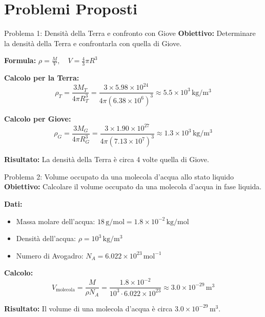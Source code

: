 \documentclass[9pt]{beamer}
\begin{document}
\section{Problemi Proposti}

\begin{frame}{Problema 1: Densità della Terra e confronto con Giove}
    \textbf{Obiettivo:} Determinare la densità della Terra e confrontarla con quella di Giove.
    
    \textbf{Formula:} $\rho = \frac{M}{V}, \quad V = \frac{4}{3} \pi R^3$
    
    \textbf{Calcolo per la Terra:}
    \[
    \rho_T = \frac{3 M_T}{4 \pi R_T^3} = \frac{3 \times 5.98 \times 10^{24}}{4 \pi (6.38 \times 10^6)^3} \approx 5.5 \times 10^3 \, \mathrm{kg/m^3}
    \]
    
    \textbf{Calcolo per Giove:}
    \[
    \rho_G = \frac{3 M_G}{4 \pi R_G^3} = \frac{3 \times 1.90 \times 10^{27}}{4 \pi (7.13 \times 10^7)^3} \approx 1.3 \times 10^3 \, \mathrm{kg/m^3}
    \]
    
    \textbf{Risultato:} La densità della Terra è circa 4 volte quella di Giove.
\end{frame}

\begin{frame}{Problema 2: Volume occupato da una molecola d'acqua allo stato liquido}
    \textbf{Obiettivo:} Calcolare il volume occupato da una molecola d'acqua in fase liquida.
    
    \textbf{Dati:}
    \begin{itemize}
        \item Massa molare dell'acqua: $18 \, \mathrm{g/mol} = 1.8 \times 10^{-2} \, \mathrm{kg/mol}$
        \item Densità dell'acqua: $\rho = 10^3 \, \mathrm{kg/m^3}$
        \item Numero di Avogadro: $N_A = 6.022 \times 10^{23} \, \mathrm{mol^{-1}}$
    \end{itemize}
    
    \textbf{Calcolo:}
    \[
    V_{\text{molecola}} = \frac{M}{\rho N_A} = \frac{1.8 \times 10^{-2}}{10^3 \cdot 6.022 \times 10^{23}} \approx 3.0 \times 10^{-29} \, \mathrm{m^3}
    \]
    
    \textbf{Risultato:} Il volume di una molecola d'acqua è circa $3.0 \times 10^{-29} \, \mathrm{m^3}$.
\end{frame}
\end{document}
